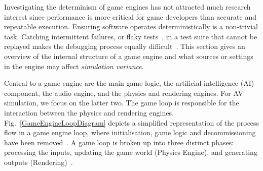 \documentclass[runningheads,twocolumn,a4paper,10pt]{llncs}
\begin{document}
Investigating the determinism of game engines has not attracted much research interest since performance is more critical for game developers than accurate and repeatable execution.  %
%
Ensuring software operates deterministically is a non-trivial task.  Catching intermittent failures, or flaky tests~\cite{intermittently-failing-tests}, in a test suite that cannot be replayed makes the debugging process equally difficult~\cite{acm-q-rr-interview}.
%
%
%
This section gives an overview of the internal structure of a game engine and what sources or settings in the engine may affect \textit{simulation variance}.
%


Central to a game engine are the main game logic, the artificial intelligence (AI) component, the audio engine, and the physics and rendering engines. For AV simulation, we focus on the latter two.
%
The game loop is responsible for the interaction between the physics and rendering engines. Fig.~\ref{GameEngineLoopDiagram} depicts a simplified representation of the process flow in a game engine loop, where  initialisation, game logic and decommissioning have been removed~\cite{unity_event_execution}.
A game loop is broken up into three distinct phases: processing the inputs, updating the game world (Physics Engine), and generating outputs (Rendering)~\cite{GameEngineArchBook}.
\end{document}
